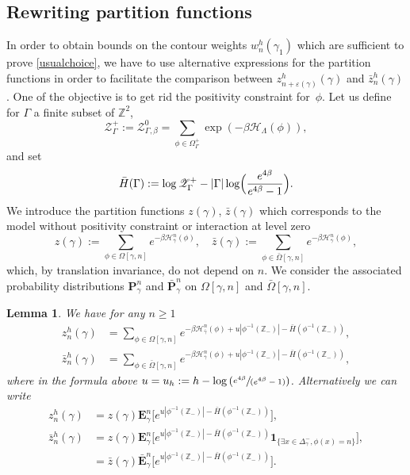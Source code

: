 \documentclass[JEP,XML,SOM,Unicode, NoFloatCountersInSection]{cedram}
\let\mathcal\mathscr
\newcommand{\spfrac}[2]{\sfrac{#1}{(#2)}}
\numberwithin{equation}{section}
\theoremstyle{plain}
\newtheorem{lemma}[theorem]{Lemma}
\theoremstyle{definition}
\newcommand{\ind}{\mathbf{1}}
\newcommand{\cH}{{\ensuremath{\mathcal H}} }
\newcommand{\cZ}{{\ensuremath{\mathcal Z}} }
\newcommand{\bP}{{\ensuremath{\mathbf P}} }
\newcommand{\bE}{{\ensuremath{\mathbf E}} }
\newcommand{\bbZ}{{\ensuremath{\mathbb Z}} }
\newcommand{\gb}{\beta}
\newcommand{\gep}{\varepsilon}
\newcommand{\gG}{\Gamma}
\newcommand{\gO}{\Omega}
\newcommand{\gL}{\Lambda}
\begin{document}
\subsection{Rewriting partition functions}

In order to obtain bounds on the contour weights $w^h_n(\gamma_1)$
which are sufficient to prove \eqref{usualchoice}, we have to use alternative expressions for the partition functions in order to facilitate
the comparison between
$z^h_{n+\gep(\gamma)}(\gamma)$ and $\bar z^h_n(\gamma)$.
One of the objective is to get rid the positivity constraint for~$\phi$.
Let us define for $\gG$ a finite subset of $\bbZ^2$,
\begin{equation*}%
\cZ^+_{\gG}:=\cZ^0_{\gG,\gb}=\sum_{\phi\in \gO^+_{\gG}} \exp\left(-\gb \cH_\gL(\phi)\right),
\end{equation*}
and set
\begin{equation*}
\bar H(\gG):= \log \cZ^+_{\gG}-|\gG|\log \Bigl(\frac{e^{4\gb}}{e^{4\gb}-1}\Bigl).
\end{equation*}
We introduce the partition functions $z(\gamma)$, $\bar z(\gamma)$ which corresponds to the model without positivity constraint or interaction at level zero
\begin{equation}\label{tambem}
z(\gamma):=\sum_{\phi\in \gO[\gamma,n]}e^{-\gb\cH^n_{\bar \gamma}(\phi)}, \quad \bar z(\gamma):=\sum_{\phi\in \bar \gO[\gamma,n]}e^{-\gb\cH^n_{\bar \gamma}(\phi)},
\end{equation}
which, by translation invariance, do not depend on $n$. We consider the associated probability distributions $\bP^n_{\gamma}$ and $\bar \bP^n_{\gamma}$ on $\gO[\gamma,n]$ and $\bar \gO[\gamma,n]$.

\begin{lemma}\label{rwo}
We have for any $n\ge 1$
\begin{equation}\label{swoutch}\begin{split}
z^h_n(\gamma)&=\sum_{\phi\in \gO[\gamma,n]} e^{-\gb \cH^n_{\bar \gamma}(\phi)+ u|\phi^{-1}(\bbZ_-)|-\bar H(\phi^{-1}(\bbZ_-))},\\
\bar z^h_n(\gamma)&=\sum_{\phi\in \bar \gO[\gamma,n]} e^{-\gb \cH^n_{\bar \gamma}(\phi)+ u|\phi^{-1}(\bbZ_-)|-\bar H(\phi^{-1}(\bbZ_-))},
\end{split}\end{equation}
where in the formula above $u=u_h:= h- \log \left(\spfrac{e^{4\gb}}{e^{4\gb}-1}\right)$.
Alternatively we can write
\begin{equation}\label{dooz}\begin{split}
z^h_n(\gamma)&= z(\gamma)\bE^n_{\gamma}\bigl[e^{u|\phi^{-1}(\bbZ_-)|-\bar H(\phi^{-1}(\bbZ_-))}\bigr],\\
\bar z^h_n(\gamma)&= z(\gamma)\bE^n_{\gamma}\bigl[e^{u|\phi^{-1}(\bbZ_-)|-\bar H(\phi^{-1}(\bbZ_-))}\ind_{\{\exists x\in \Delta^-_{\gamma}, \phi(x)=n\}} \bigr],\\
&=\bar z(\gamma)\bar \bE^n_{\gamma}\bigl[e^{u|\phi^{-1}(\bbZ_-)|-\bar H(\phi^{-1}(\bbZ_-))}\bigr].
\end{split}\end{equation}
\end{lemma}
\end{document}

